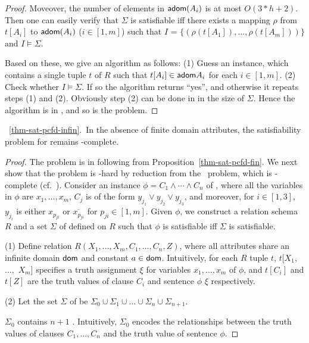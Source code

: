 {\begin{proof}
\noindent Moveover, the number of elements in ${\mathsf{adom}}(A_i)$ is at
most $O(3*h + 2)$. Then one can easily verify that $\Sigma$ is
satisfiable iff there exists a mapping $\rho$ from $t[A_i]$ to
${\mathsf{adom}}(A_i)$ ($i\in [1, m]$) such that $I$ = $\{(\rho(t[A_1]),
\ldots, \rho(t[A_m]))\}$ and $I \models \Sigma$.


Based on these, we give an \NP algorithm as follows: (1) Guess an
instance, which contains a single tuple $t$ of $R$ such that
$t[A_i]\in{\ensuremath {\mathsf{adom}}}{A_i}$ for each $i \in [1, m]$. (2) Check whether $I
\models \Sigma$. If so the algorithm returns ``yes'', and otherwise
it repeats steps (1) and (2). Obviously step (2) can be done in
\PTIME in the size of $\Sigma$. Hence the algorithm is in \NP, and
so is the problem. \eop
\end{proof}

\vspace{2ex} \noindent{}~\ref{thm-sat-pcfd-infin}.~In the
absence of finite domain attributes, the satisfiability problem for
\pCFDs remains \NP-complete. \eop

\begin{proof}
The problem is in \NP following from
Proposition~\ref{thm-sat-pcfd-fin}. We next show that the problem is
\NP-hard by reduction from the \kSAT\ problem, which is \NP-complete
(cf.~\cite{GaJo79}). Consider an instance $\phi = C_1 \land \cdots
\land C_n$ of \kSAT, where all the variables in $\phi$ are $x_1,
\ldots, x_m$, $C_j$ is of the form $y_{j_1} \lor y_{j_2} \lor
y_{j_3}$, and moreover, for $i\in[1,3]$, $y_{j_i}$ is either
$x_{p_{ji}}$ or $\overline{x_{p_{ji}}}$ for $p_{ji} \in [1, m]$.
Given $\phi$, we construct a relation schema $R$ and a set $\Sigma$
of \pCFDs defined on $R$ such that $\phi$ is satisfiable iff
$\Sigma$ is satisfiable.

\noindent (1) Define relation $R$$(X_1, \ldots, X_m, C_1, \ldots,
C_n, Z)$, where all attributes share an infinite domain $\protect\mathsf{dom}$ and
constant $a\in\protect\mathsf{dom}$. Intuitively, for each $R$ tuple $t$, $t[X_1,$ $
\ldots,$ $X_m]$ specifies a truth assignment $\xi$ for variables
$x_1, \ldots, x_m$ of $\phi$, and $t[C_i]$ and $t[Z]$ are the truth
values of clause $C_i$ and sentence $\phi$ \wrt $\xi$ respectively.

\noindent (2) Let the set $\Sigma$ of \pCFDs be
$\Sigma_0\cup\Sigma_1\cup\ldots\cup\Sigma_n\cup\Sigma_{n+1}$.

\vspace{-1.5ex}\bi
\item $\Sigma_0$ contains $n + 1$ \pCFDs. Intuitively, $\Sigma_0$
encodes the relationships between the truth values of clauses $C_1,
\ldots, C_n$ and the truth value of sentence $\phi$.


\end{proof}}
